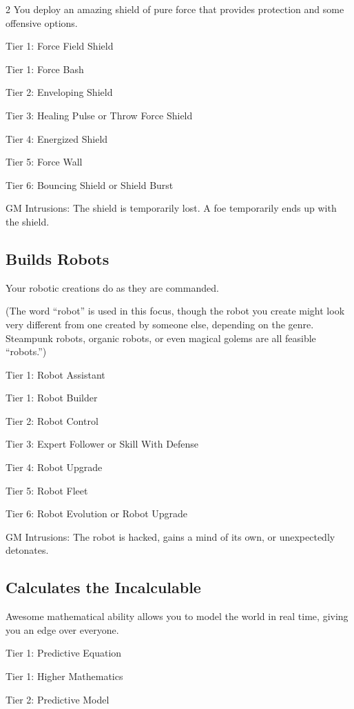 \begin{multicols}{2}
You deploy an amazing shield of pure force that provides protection and some offensive options.

Tier 1: Force Field Shield

Tier 1: Force Bash

Tier 2: Enveloping Shield

Tier 3: Healing Pulse or Throw Force Shield

Tier 4: Energized Shield

Tier 5: Force Wall

Tier 6: Bouncing Shield or Shield Burst

GM Intrusions: The shield is temporarily lost. A foe temporarily ends up with the shield.

\subsection{Builds Robots}

Your robotic creations do as they are commanded.

(The word “robot” is used in this focus, though the robot you create might look very different from one created by someone else, depending on the genre. Steampunk robots, organic robots, or even magical golems are all feasible “robots.”)

Tier 1: Robot Assistant

Tier 1: Robot Builder

Tier 2: Robot Control

Tier 3: Expert Follower or Skill With Defense

Tier 4: Robot Upgrade

Tier 5: Robot Fleet

Tier 6: Robot Evolution or Robot Upgrade

GM Intrusions: The robot is hacked, gains a mind of its own, or unexpectedly detonates. 

\subsection{Calculates the Incalculable}

Awesome mathematical ability allows you to model the world in real time, giving you an edge over everyone.

Tier 1: Predictive Equation

Tier 1: Higher Mathematics

Tier 2: Predictive Model


\end{multicols}
